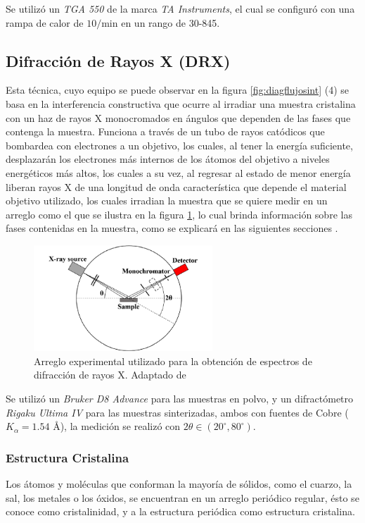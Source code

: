 \documentclass[../main.tex]{subfiles}
\begin{document}
Se utilizó un \textit{TGA 550} de la marca \textit{TA Instruments}, el cual se configuró con una rampa de calor de $10$\gradoC{}$/$min en un rango de 30\gradoC{}-845\gradoC{}.
\subsection{Difracción de Rayos X (DRX)}
Esta técnica, cuyo equipo se puede observar en la figura \ref{fig:diagflujosint} (4) se basa en la interferencia constructiva que ocurre al irradiar una muestra cristalina con un haz de rayos X monocromados en ángulos que dependen de las fases que contenga la muestra. Funciona a través de un tubo de rayos catódicos que bombardea con electrones a un objetivo, los cuales, al tener la energía suficiente, desplazarán los electrones más internos de los átomos del objetivo a niveles energéticos más altos, los cuales a su vez, al regresar al estado de menor energía liberan rayos X de una longitud de onda característica que depende el material objetivo utilizado, los cuales irradian la muestra que se quiere medir en un arreglo como el que se ilustra en la figura \ref{fig:diagDRX}, lo cual brinda información sobre las fases contenidas en la muestra, como se explicará en las siguientes secciones \cite{dutrowxrd}.
\begin{figure}[H]
    \centering
    \includegraphics[width=0.6\textwidth]{fig/DRXdiag.png}
    \caption{Arreglo experimental utilizado para la obtención de espectros de difracción de rayos X. Adaptado de \cite{Jung2023}}
    \label{fig:diagDRX}
\end{figure}

Se utilizó un \textit{Bruker D8 Advance} para las muestras en polvo, y un  difractómetro \textit{Rigaku Ultima IV} para las muestras sinterizadas, ambos con fuentes de Cobre ($K_\alpha=1.54$ \r{A}), la medición se realizó con $2\theta\in(20^\circ,80^\circ)$.
\subsubsection{Estructura Cristalina}
Los átomos y moléculas que conforman la mayoría de sólidos, como el cuarzo, la sal, los metales o los óxidos, se encuentran en un arreglo periódico regular, ésto se conoce como cristalinidad, y a la estructura periódica como estructura cristalina.
\end{document}
